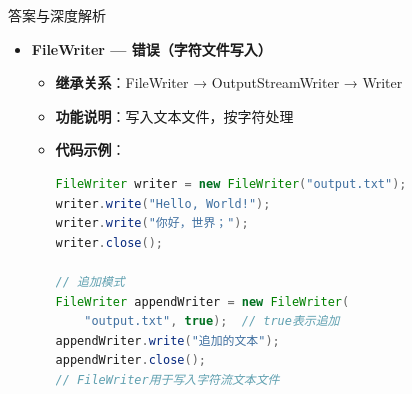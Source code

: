 \documentclass[12pt, a4paper]{ctexart}
\begin{document}
\begin{enumerate}[label=\textbf{\arabic*.}]
\begin{bluebox}{答案与深度解析}
\begin{itemize}[leftmargin=*, nosep, label={}]
\begin{itemize}[label={}, leftmargin=*, nosep]
\begin{lstlisting}[language=Java]
public class FileReaderDemo {
    public static void main(String[] args) {
        try {
            // 创建FileReader
            FileReader reader = new FileReader("test.txt");

            // 方式1：逐字符读取
            int ch;
            while ((ch = reader.read()) != -1) {
                System.out.print((char) ch);  // int转char
            }
            reader.close();

            // 方式2：读取到字符数组
            char[] buffer = new char[1024];
            int len;
            FileReader reader2 = new FileReader("test.txt");
            while ((len = reader2.read(buffer)) != -1) {
                System.out.print(new String(buffer, 0, len));
            }
            reader2.close();
        } catch (IOException e) {
            e.printStackTrace();
        }
    }
}
// FileReader用于读取字符流文本文件
				      \end{lstlisting}
				            \item \textbf{字符编码}：使用平台默认编码，建议指定编码
				                  \begin{lstlisting}[language=Java]
// 推荐方式：指定编码
FileReader reader = new FileReader("test.txt",
    Charset.forName("UTF-8"));
// 或者
InputStreamReader isr = new InputStreamReader(
    new FileInputStream("test.txt"), "UTF-8");
				      \end{lstlisting}
			            \end{itemize}

			      \item[B] \textbf{FileWriter — 错误（字符文件写入）}
			            \begin{itemize}[label={}, leftmargin=*, nosep]
				            \item \textbf{继承关系}：FileWriter → OutputStreamWriter → Writer
				            \item \textbf{功能说明}：写入文本文件，按字符处理
				            \item \textbf{代码示例}：
				                  \begin{lstlisting}[language=Java]
FileWriter writer = new FileWriter("output.txt");
writer.write("Hello, World!");
writer.write("你好，世界；");
writer.close();

// 追加模式
FileWriter appendWriter = new FileWriter(
    "output.txt", true);  // true表示追加
appendWriter.write("追加的文本");
appendWriter.close();
// FileWriter用于写入字符流文本文件
				      \end{lstlisting}
			            \end{itemize}


\end{itemize}
\end{bluebox}
\end{enumerate}
\end{document}
